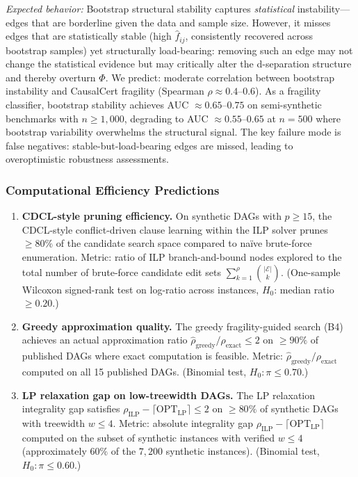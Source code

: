 \documentclass[11pt,a4paper]{article}
\theoremstyle{definition}
\theoremstyle{remark}
\newcommand{\radius}{\rho}
\newcommand{\Phi}{\varPhi}
\begin{document}
\begin{enumerate}[label=\textbf{B\arabic*:},start=7]
  \emph{Expected behavior:} Bootstrap structural stability captures
  \emph{statistical} instability---edges that are borderline given the
  data and sample size. However, it misses edges that are statistically
  stable (high $\hat{f}_{ij}$, consistently recovered across bootstrap
  samples) yet structurally load-bearing: removing such an edge may not
  change the statistical evidence but may critically alter the
  d-separation structure and thereby overturn $\Phi$. We predict:
  moderate correlation between bootstrap instability and CausalCert
  fragility (Spearman $\rho \approx 0.4$--$0.6$). As a fragility
  classifier, bootstrap stability achieves AUC $\approx 0.65$--$0.75$
  on semi-synthetic benchmarks with $n \geq 1{,}000$, degrading to
  AUC $\approx 0.55$--$0.65$ at $n = 500$ where bootstrap variability
  overwhelms the structural signal. The key failure mode is false
  negatives: stable-but-load-bearing edges are missed, leading to
  overoptimistic robustness assessments.
\end{enumerate}


\subsubsection{Computational Efficiency Predictions}

\begin{enumerate}[label=\textbf{P\arabic*:},start=18]
\item \textbf{CDCL-style pruning efficiency.} On synthetic DAGs with
  $p \geq 15$, the CDCL-style conflict-driven clause learning within
  the ILP solver prunes $\geq 80\%$ of the candidate search space
  compared to na\"ive brute-force enumeration. Metric: ratio of ILP
  branch-and-bound nodes explored to the total number of brute-force
  candidate edit sets $\sum_{k=1}^{\radius} \binom{|\mathcal{E}|}{k}$.
  (One-sample Wilcoxon signed-rank test on log-ratio across instances,
  $H_0$: median ratio $\geq 0.20$.)

\item \textbf{Greedy approximation quality.} The greedy
  fragility-guided search (B4) achieves an actual approximation ratio
  $\hat\radius_{\mathrm{greedy}} / \radius_{\mathrm{exact}} \leq 2$ on
  $\geq 90\%$ of published DAGs where exact computation is feasible.
  Metric: $\hat\radius_{\mathrm{greedy}} / \radius_{\mathrm{exact}}$
  computed on all 15 published DAGs. (Binomial test,
  $H_0: \pi \leq 0.70$.)

\item \textbf{LP relaxation gap on low-treewidth DAGs.} The LP
  relaxation integrality gap satisfies
  $\radius_{\mathrm{ILP}} - \lceil\mathrm{OPT}_{\mathrm{LP}}\rceil \leq 2$
  on $\geq 80\%$ of synthetic DAGs with treewidth $w \leq 4$.
  Metric: absolute integrality gap
  $\radius_{\mathrm{ILP}} - \lceil\mathrm{OPT}_{\mathrm{LP}}\rceil$
  computed on the subset of synthetic instances with verified
  $w \leq 4$ (approximately $60\%$ of the $7{,}200$ synthetic
  instances). (Binomial test, $H_0: \pi \leq 0.60$.)
\end{enumerate}
\end{document}

